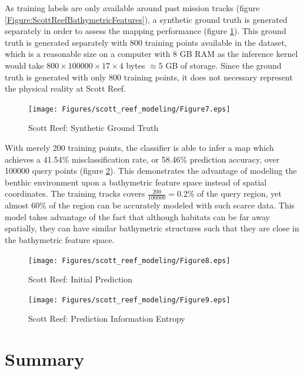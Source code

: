 			As training labels are only available around past mission tracks (figure \ref{Figure:ScottReefBathymetricFeatures}), a synthetic ground truth is generated separately in order to assess the mapping performance (figure \ref{Figure:ScottReefSyntheticGroundTruth}). This ground truth is generated separately with 800 training points available in the dataset, which is a reasonable size on a computer with 8 GB RAM as the inference kernel would take $800 \times 100000 \times 17 \times 4$ bytes $\approx 5$ GB of storage. Since the ground truth is generated with only 800 training points, it does not necessary represent the physical reality at Scott Reef. 
	
			\begin{figure}[!htbp]
			\centering
				\texttt{[image: Figures/scott\_reef\_modeling/Figure7.eps]}
			\caption{Scott Reef: Synthetic Ground Truth}
			\label{Figure:ScottReefSyntheticGroundTruth}
			\end{figure}
			
			With merely 200 training points, the classifier is able to infer a map which achieves a 41.54\% misclassification rate, or 58.46\% prediction accuracy, over 100000 query points (figure \ref{Figure:ScottReefInitialPredictions}). This demonstrates the advantage of modeling the benthic environment upon a bathymetric feature space instead of spatial coordinates. The training tracks covers $\frac{200}{100000} = 0.2\%$ of the query region, yet almost 60\% of the region can be accurately modeled with such scarce data. This model takes advantage of the fact that although habitats can be far away spatially, they can have similar bathymetric structures such that they are close in the bathymetric feature space.
	
			\begin{figure}[!htbp]
			\centering
				\texttt{[image: Figures/scott\_reef\_modeling/Figure8.eps]}
			\caption{Scott Reef: Initial Prediction}
			\label{Figure:ScottReefInitialPredictions}
			\end{figure}
			
			
			
			\begin{figure}[bp]
			\centering
				\texttt{[image: Figures/scott\_reef\_modeling/Figure9.eps]}
			\caption{Scott Reef: Prediction Information Entropy}
			\label{Figure:ScottReefPredictionInformationEntropy}
			\end{figure}
						
	\section{Summary}
	
			